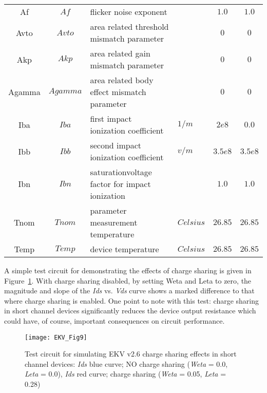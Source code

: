 \begin{scriptsize}
\begin{longtable}{ccllcc}
Af   & $Af$  & flicker noise exponent                   &    & $1.0$ & $1.0$ \\
Avto  & $Avto$ & area related threshold mismatch parameter  &    & $0$ & $0$ \\
Akp   & $Akp$  & area related gain mismatch parameter       &    & $0$ & $0$ \\
Agamma   & $Agamma$  & area related body effect mismatch parameter &    & $0$ & $0$ \\
Iba  & $Iba$ & first impact ionization coefficient  & $1/m$   & $2e8$ & $0.0$ \\
Ibb   & $Ibb$  & second impact ionization coefficient & $v/m$    & $3.5e8$ & $3.5e8$ \\
Ibn   & $Ibn$  & saturationvoltage factor for impact ionization  &    & $1.0$ & $1.0$ \\
Tnom & $Tnom$ & parameter measurement temperature  & $Celsius$    & $26.85$ & $26.85$ \\
Temp & $Temp$ & device temperature  & $Celsius$   & $26.85$ & $26.85$ \\

\end{longtable}
\end{scriptsize}


A simple test circuit for demonstrating the effects of charge sharing
is given in Figure~\ref{fig:EKV9}. With charge sharing disabled, by
setting Weta and Leta to zero, the magnitude and slope of the
\textit{Ids} vs. \textit{Vds} curve shows a marked difference to that
where charge sharing is enabled.  One point to note with this test:
charge sharing in short channel devices significantly reduces the
device output resistance which could have, of course, important
consequences on circuit performance.

\begin{figure}
  \centering
  \texttt{[image: EKV\_Fig9]}
  \caption{Test circuit for simulating EKV v2.6 charge sharing effects in short channel devices: \textit{Ids} blue curve; NO charge sharing (\textit{Weta} = 0.0, \textit{Leta} = 0.0), \textit{Ids} red curve; charge sharing (\textit{Weta} = 0.05, \textit{Leta} = 0.28) }
  \label{fig:EKV9}
\end{figure}  



